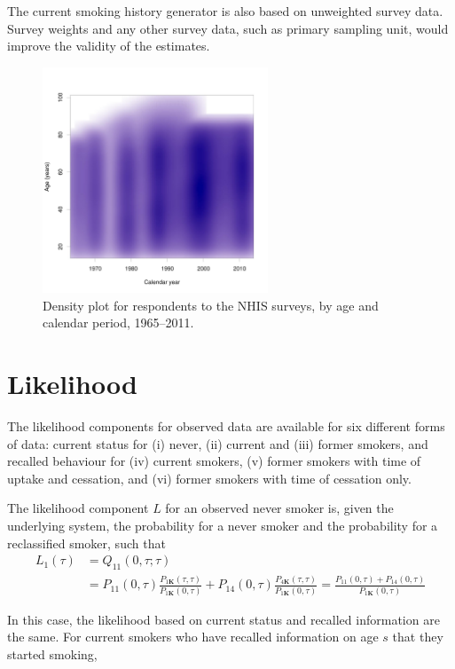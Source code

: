 \documentclass[11pt,a4paper]{article}
\newcommand{\K}{\ensuremath{\bm{K}}}
\begin{document}
The current smoking history generator is also based on unweighted
survey data. Survey weights and any other survey data, such as primary
sampling unit, would improve the validity of the estimates. 

\begin{figure}[h]
  \centering
  \includegraphics[width=0.6\textwidth]{nhis_density.jpg}    
  \caption{Density plot for respondents to the NHIS surveys, by age and calendar period, 1965--2011.}
  \label{fig:nhis}
\end{figure}


\section{Likelihood}

The likelihood components for observed data are available for six
different forms of data: current status for (i) never, (ii) current
and (iii) former smokers, and recalled behaviour for (iv) current
smokers, (v) former smokers with time of uptake and cessation, and
(vi) former smokers with time of cessation only.  

The likelihood component $L$ for an observed never smoker is, given the underlying system, the 
probability for a never smoker and the probability for a reclassified smoker, such that
\begin{align*}
L_1(\tau) & = Q_{11}(0,\tau;\tau) \\
& = P_{11}(0,\tau)\frac{P_{1\K}(\tau,\tau)}{P_{1\K}(0,\tau)} +P_{14}(0,\tau)\frac{P_{4\K}(\tau,\tau)}{P_{1\K}(0,\tau)} 
= \frac{P_{11}(0,\tau)+P_{14}(0,\tau)}{P_{1\K}(0,\tau)}  
\end{align*}

In this case, the likelihood based on current status and recalled information are the same.
For current smokers who have recalled information on age $s$ that they started smoking,
\end{document}
